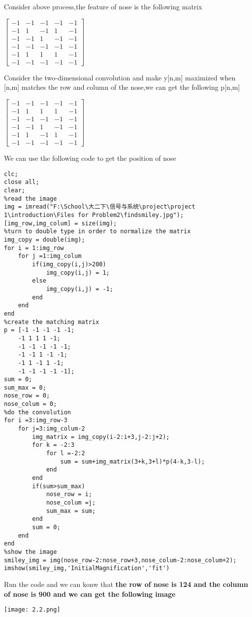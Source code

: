 \documentclass{article}
\begin{document}
Consider above process,the feature of nose is the following matrix
\begin{center}
    \begin{math}
        \begin{bmatrix}
            -1 & -1 & -1 & -1 & -1\\
            -1 & 1 & -1 & 1 & -1\\
            -1 & -1 & 1 & -1 & -1\\
            -1 & -1 & -1 & -1 & -1\\
            -1 & 1 & 1 & 1 & -1\\
            -1 & -1 & -1 & -1 & -1
        \end{bmatrix}
    \end{math}
\end{center}
Consider the two-dimensional convolution and make y[n,m] maximized when [n,m]
matches the row and column of the nose,we can get the following p[n,m]
\begin{center}
    \begin{math}
        \begin{bmatrix}
            -1 & -1 & -1 & -1 & -1\\
            -1 & 1 & 1 & 1 & -1\\
            -1 & -1 & -1 & -1 & -1\\
            -1 & -1 & 1 & -1 & -1\\
            -1 & 1 & -1 & 1 & -1\\
            -1 & -1 & -1 & -1 & -1
        \end{bmatrix}
    \end{math}
\end{center}
We can use the following code to get the position of nose
\begin{lstlisting}
clc;
close all;
clear;
%read the image
img = imread("F:\School\大二下\信号与系统\project\project 1\introduction\Files for Problem2\findsmiley.jpg");
[img_row,img_colum] = size(img);
%turn to double type in order to normalize the matrix
img_copy = double(img);
for i = 1:img_row
    for j =1:img_colum
        if(img_copy(i,j)>200)
            img_copy(i,j) = 1;
        else
            img_copy(i,j) = -1;
        end
    end
end
%create the matching matrix
p = [-1 -1 -1 -1 -1;
    -1 1 1 1 -1;
    -1 -1 -1 -1 -1;
    -1 -1 1 -1 -1;
    -1 1 -1 1 -1;
    -1 -1 -1 -1 -1];
sum = 0;
sum_max = 0;
nose_row = 0;
nose_colum = 0;
%do the convolution
for i =3:img_row-3
    for j=3:img_colum-2
        img_matrix = img_copy(i-2:i+3,j-2:j+2);
        for k = -2:3
            for l =-2:2
                sum = sum+img_matrix(3+k,3+l)*p(4-k,3-l);
            end
        end
        if(sum>sum_max)
            nose_row = i;
            nose_colum =j;
            sum_max = sum;
        end
        sum = 0;
    end
end
%show the image
smiley_img = img(nose_row-2:nose_row+3,nose_colum-2:nose_colum+2);
imshow(smiley_img,'InitialMagnification','fit')
\end{lstlisting}
Run the code and we can konw that \bf{the row of nose is 124} and 
\bf{the column of nose is 900} and we can get the following image
\begin{center}
    \texttt{[image: 2.2.png]}
\end{center}
\end{document}
